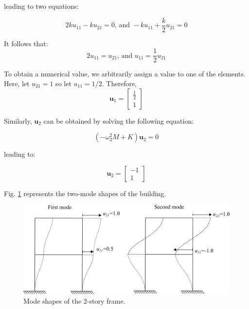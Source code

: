 \documentclass[12pt,letter]{article}
\begin{document}
\begin{example}
\noindent leading to two equations:

\begin{equation}
2 k u_{11} -k u_{21}=0 \text{, and } -k u_{11} + \frac{k}{2} u_{21}=0
\end{equation}

\noindent It follows that:
\begin{equation}
2 u_{11}= u_{21}  \text{, and } u_{11} = \frac{1}{2}u_{21}
\end{equation}

\noindent To obtain a numerical value, we arbitrarily assign a value to one of the elements. Here, let $u_{21}=1$ so let $u_{11}=1/2$. Therefore, 
\begin{equation}
\textbf{u}_1 = \begin{bmatrix} \frac{1}{2}\\ 1\end{bmatrix}
\end{equation}

\noindent Similarly, $\mathbf{u}_2$ can be obtained by solving the following equation:

\begin{equation}
(-\omega_2^2 M  + K)\mathbf{u}_2 =0
\end{equation}

\noindent leading to:

\begin{equation}
	\textbf{u}_2 = \begin{bmatrix} -1\\ 1\end{bmatrix}
\end{equation}

\noindent Fig. \ref{fig:modeshapes} represents the two-mode shapes of the building. 

\vspace{4ex}

\begin{figure}[H]
	\centering
	\includegraphics{../figures/two_story_frame_example_mode_shapes.png}
	\caption{Mode shapes of the 2-story frame.}
	\label{fig:modeshapes}
\end{figure}


\end{example}
\end{document}
